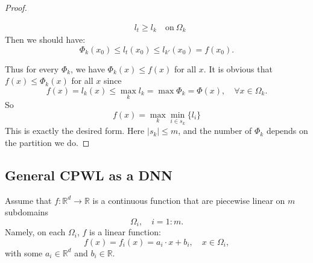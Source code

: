 \begin{proof}
\begin{enumerate}
\begin{enumerate}
\begin{equation*}
\begin{aligned}
			&l_t\ge l_{k}\quad \mathrm{on}\ \Omega_{k}
			\end{aligned}
			\end{equation*}
			Then we should have:
			$$\Phi_{k}(x_0)\le l_t(x_0)\le l_{k'}(x_0)=f(x_0).$$
		\end{enumerate}
	\end{enumerate}
Thus for every $\Phi_{k}$, we have $\Phi_{k}(x)\le f(x)$ for all $x$. It is obvious that  $f(x)\le \Phi_{k}(x)$ for all $x$ since
$$
f(x)=l_k(x)\le \max_k l_k=\max \Phi_k=\Phi(x),\quad \forall x\in \Omega_k.
$$
So 
			$$f(x)=\max_{k}\min_{i\in s_k}\{l_i\}$$
			This is exactly the desired form. Here $|s_k|\le m$, and the number of $\Phi_{k}$ depends on the partition we do. 
\end{proof}




\subsection{General CPWL as a DNN}

Assume that $f:\mathbb{R}^d\to\mathbb{R}$ is a continuous function
that are piecewise linear on $m$ subdomains
$$
\Omega_i, \quad i=1:m.
$$
Namely, on each $\Omega_i$, $f$ is a linear function:
$$
f(x)=f_i(x)=a_i\cdot x+b_i, \quad x\in \Omega_i,
$$
with some $a_i \in \mathbb{R}^d$ and $b_i \in \mathbb{R}$.

